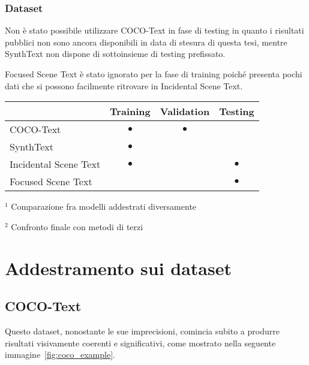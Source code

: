 \subsubsection{Dataset}
Non è stato possibile utilizzare COCO-Text in fase di testing in quanto i risultati pubblici non sono ancora disponibili in data di stesura di questa tesi, mentre SynthText non dispone di sottoinsieme di testing prefissato.\par
Focused Scene Text è stato ignorato per la fase di training poiché presenta pochi dati che si possono facilmente ritrovare in Incidental Scene Text.\par

\begin{table}[H]
\centering
\begin{threeparttable}
	\begin{tabular}{l*{3}{c}}
		\toprule
		& Training	& Validation\footnotemark[1] & Testing\footnotemark[2] \\
		\midrule
		COCO-Text				& $\bullet$	& $\bullet$	&           \\
		SynthText				& $\bullet$	&			&           \\
		Incidental Scene Text	& $\bullet$	&			& $\bullet$	\\
		Focused Scene Text		&          	&			& $\bullet$ \\
		\bottomrule
	\end{tabular}
	\begin{tablenotes}
		\small
		\item
			$^{1}$ Comparazione fra modelli addestrati diversamente
		\item
			$^{2}$ Confronto finale con metodi di terzi
	\end{tablenotes}
\end{threeparttable}
\end{table}



\section{Addestramento sui dataset}


\subsection{COCO-Text}
\label{subsec:train_coco}
Questo dataset, nonostante le sue imprecisioni, comincia subito a produrre risultati visivamente coerenti e significativi, come mostrato nella seguente immagine~\ref{fig:coco_example}.\par

